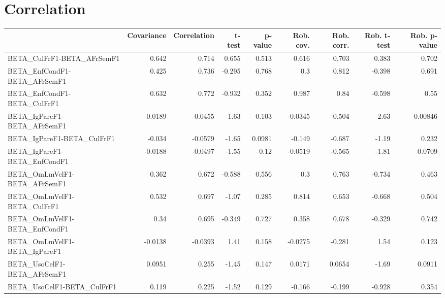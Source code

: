 \section{Correlation}
\begin{tabular}{lrrrrrrrr}
\toprule
{} &  Covariance &  Correlation &   t-test &  p-value &  Rob. cov. &  Rob. corr. &  Rob. t-test &  Rob. p-value \\
\midrule
BETA\_CulFrF1-BETA\_AFrSemF1            &       0.642 &        0.714 &    0.655 &    0.513 &      0.616 &       0.703 &        0.383 &         0.702 \\
BETA\_EnfCondF1-BETA\_AFrSemF1          &       0.425 &        0.736 &   -0.295 &    0.768 &        0.3 &       0.812 &       -0.398 &         0.691 \\
BETA\_EnfCondF1-BETA\_CulFrF1           &       0.632 &        0.772 &   -0.932 &    0.352 &      0.987 &        0.84 &       -0.598 &          0.55 \\
BETA\_IgPareF1-BETA\_AFrSemF1           &     -0.0189 &      -0.0455 &    -1.63 &    0.103 &    -0.0345 &      -0.504 &        -2.63 &       0.00846 \\
BETA\_IgPareF1-BETA\_CulFrF1            &      -0.034 &      -0.0579 &    -1.65 &   0.0981 &     -0.149 &      -0.687 &        -1.19 &         0.232 \\
BETA\_IgPareF1-BETA\_EnfCondF1          &     -0.0188 &      -0.0497 &    -1.55 &     0.12 &    -0.0519 &      -0.565 &        -1.81 &        0.0709 \\
BETA\_OmLmVelF1-BETA\_AFrSemF1          &       0.362 &        0.672 &   -0.588 &    0.556 &        0.3 &       0.763 &       -0.734 &         0.463 \\
BETA\_OmLmVelF1-BETA\_CulFrF1           &       0.532 &        0.697 &    -1.07 &    0.285 &      0.814 &       0.653 &       -0.668 &         0.504 \\
BETA\_OmLmVelF1-BETA\_EnfCondF1         &        0.34 &        0.695 &   -0.349 &    0.727 &      0.358 &       0.678 &       -0.329 &         0.742 \\
BETA\_OmLmVelF1-BETA\_IgPareF1          &     -0.0138 &      -0.0393 &     1.41 &    0.158 &    -0.0275 &      -0.281 &         1.54 &         0.123 \\
BETA\_UsoCelF1-BETA\_AFrSemF1           &      0.0951 &        0.255 &    -1.45 &    0.147 &     0.0171 &      0.0654 &        -1.69 &        0.0911 \\
BETA\_UsoCelF1-BETA\_CulFrF1            &       0.119 &        0.225 &    -1.52 &    0.129 &     -0.166 &      -0.199 &       -0.928 &         0.354 \\

\end{tabular}
